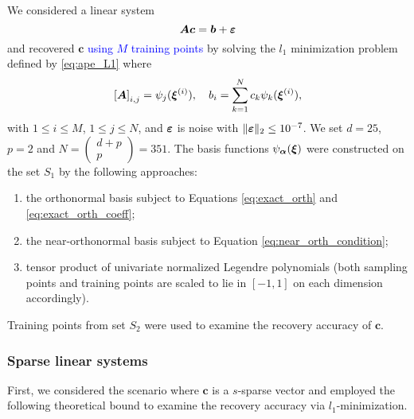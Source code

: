 We considered a linear system \[{\bm A} \bm c = {\bm b} + \bm{\varepsilon} \] and recovered $\bm c$ \textcolor{blue}{using $M$ training points} 
by solving the $l_1$ minimization problem defined by \eqref{eq:ape_L1} where 
\begin{equation}
\left[ {\bm A} \right]_{i,j} = \psi_{j}(\bm\xi^{(i)}), \quad b_i = \sum_{k=1}^N c_{k} \psi_{k}(\bm\xi^{(i)}), 
\label{eq:matA}
\end{equation}
with $1\le i \le M$, $1\le j \le N$, and $\bm {\varepsilon}$ is noise with $\|\bm {\varepsilon}\|_2\leq 10^{-7}$. 
We set $d = 25$, $p = 2$ and $N =  \left( \begin{array}{c} d+p \\ p\end{array}\right) = 351$. 
The basis functions $\psi_{\bm\alpha}(\bm\xi)$ were constructed on the set $S_1$ by the following approaches: 
\begin{enumerate}
  \item the orthonormal  basis subject to Equations \eqref{eq:exact_orth} and \eqref{eq:exact_orth_coeff}; 
  \item the near-orthonormal  basis subject to Equation \eqref{eq:near_orth_condition};
  \item tensor product of univariate normalized Legendre polynomials (both sampling points and training points are scaled to lie in $[-1, 1]$ on each dimension accordingly). 
\end{enumerate}
Training points from set $S_2$ were used to examine the recovery accuracy of $\bm c$.

\subsubsection{Sparse linear systems}
\label{sec:recover_sparse}
First, we considered the scenario where $\bm c$ is a $s$-sparse vector and employed the following theoretical bound to examine the recovery accuracy via $l_1$-minimization.

